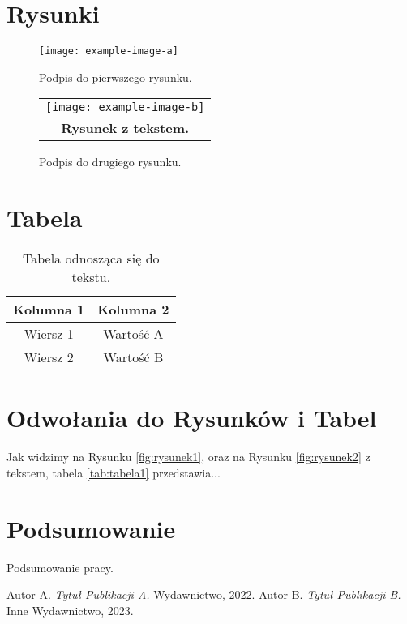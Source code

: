 \documentclass{article}
\begin{document}
\section{Rysunki}
\begin{figure}[h]
    \centering
    \texttt{[image: example-image-a]}
    \caption{Podpis do pierwszego rysunku.}
\end{figure}

\begin{figure}[h]
    \centering
    \begin{tabular}{c}
        \texttt{[image: example-image-b]} \\
        \textbf{Rysunek z tekstem.}
    \end{tabular}
    \caption{Podpis do drugiego rysunku.}
\end{figure}

\section{Tabela}
\begin{table}[h]
    \centering
    \begin{tabular}{|c|c|}
        \hline
        Kolumna 1 & Kolumna 2 \\
        \hline
        Wiersz 1  & Wartość A \\
        \hline
        Wiersz 2  & Wartość B \\
        \hline
    \end{tabular}
    \caption{Tabela odnosząca się do tekstu.}
\end{table}

\section{Odwołania do Rysunków i Tabel}
Jak widzimy na Rysunku \ref{fig:rysunek1}, oraz na Rysunku \ref{fig:rysunek2} z tekstem, tabela \ref{tab:tabela1} przedstawia...

\section{Podsumowanie}
Podsumowanie pracy.

\begin{thebibliography}{9}
     Autor A. \emph{Tytuł Publikacji A.} Wydawnictwo, 2022.
     Autor B. \emph{Tytuł Publikacji B.} Inne Wydawnictwo, 2023.
\end{thebibliography}
\end{document}
